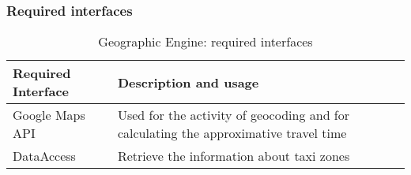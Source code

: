 \subsubsection{Required interfaces}
\begin{table}[H]
	\begin{longtable}{| l | p{} |}
		\hline
		\textbf{Required Interface} & \textbf{Description and usage} \\ \hline
		Google Maps API & Used for the activity of geocoding and for calculating the approximative travel time \\ \hline
		DataAccess & Retrieve the information about taxi zones \\ \hline
	\end{longtable}
	\caption{Geographic Engine: required interfaces}
	\label{tab:geographicengine:requiredInterfaces}
\end{table}
